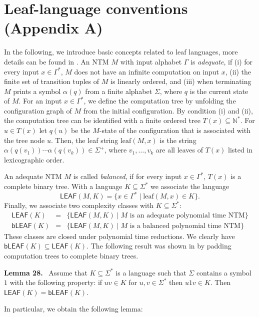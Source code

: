 \documentclass[10pt,a4paper]{article}
\newenvironment{authorclaim}[1]{\par\medskip\noindent\textbf{#1.}\ \ignorespaces}{\par\medskip}
\newcommand{\LEAF}{\mathsf{LEAF}}
\newcommand{\bLEAF}{\mathsf{bLEAF}}
\newcommand{\leaf}{\mathrm{leaf}}
\begin{document}
\section*{Leaf-language conventions (Appendix A)}

In the following, we introduce basic concepts
related to leaf languages, more details can be found in  \cite{ref11,ref23,ref25,ref24,ref29}.
An NTM $M$ with input alphabet $\Gamma$ is \emph{adequate}, if 
(i) for every input $x \in \Gamma^*$, $M$ does not have an infinite 
computation on input $x$, (ii) the finite set of transition tuples
of $M$ is linearly ordered, and (iii) when terminating $M$ prints a symbol $\alpha(q)$ from a finite alphabet $\Sigma$, where $q$ is 
 the current state of $M$.
For an input $x \in \Gamma^*$, we define the computation tree
by unfolding the configuration
graph of $M$ from the initial configuration. 
By condition (i) and (ii), the computation
tree can be identified with a  
finite ordered tree $T(x) \subseteq \mathbb{N}^*$.
For $u \in T(x)$ let $q(u)$ be the $M$-state of 
the configuration that is associated with the 
tree node $u$.
Then, the leaf string $\leaf(M,x)$
is the string $\alpha(q(v_1)) \cdots \alpha(q(v_k)) \in \Sigma^+$, where 
$v_1,\ldots,v_k$ are all leaves of $T(x)$ listed in lexicographic order.

An adequate NTM $M$ is called  \emph{balanced}, if for every input $x \in \Gamma^*$,
$T(x)$ is a complete binary tree.
With a language $K \subseteq\Sigma^*$ we associate 
the language 
$$
\LEAF(M,K) = \{ x \in  \Gamma^* \mid \leaf(M,x) \in K \}.
$$
Finally, we associate two complexity classes with $K \subseteq\Sigma^*$:
\begin{eqnarray*}
\LEAF(K) &=& \{ \LEAF(M,K) \mid \text{$M$ is an adequate polynomial time
    NTM}\}\\
\bLEAF(K) &=& \{ \LEAF(M,K) \mid \text{$M$ is a balanced polynomial time NTM}\}
\end{eqnarray*}
These classes are closed under polynomial time reductions.
We clearly have $\bLEAF(K)  \subseteq \LEAF(K)$.
The following result was shown in \cite{ref29} by padding computation trees to complete binary trees.

\begin{authorclaim}{Lemma 28}
Assume that $K \subseteq \Sigma^*$ is a language such that $\Sigma$ contains a symbol $1$ with the following property:
if $uv \in K$ for $u,v \in \Sigma^*$ then $u1v \in K$. Then $\LEAF(K)  = \bLEAF(K)$. 
\end{authorclaim}
In particular, we obtain the following lemma:
\end{document}
